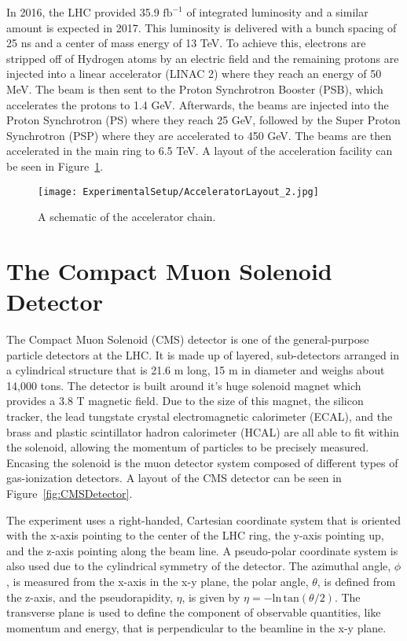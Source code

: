 In 2016, the LHC provided 35.9 $\mathrm{fb}^{-1}$ of integrated luminosity and a similar amount is expected in 2017. This luminosity is delivered with a bunch spacing of 25 ns and a center of mass energy of 13 TeV. To achieve this, electrons are stripped off of Hydrogen atoms by an electric field and the remaining protons are injected into a linear accelerator (LINAC 2) where they reach an energy of 50 MeV. The beam is then sent to the Proton Synchrotron Booster (PSB), which accelerates the protons to 1.4 GeV. Afterwards, the beams are injected into the Proton Synchrotron (PS) where they reach 25 GeV, followed by the Super Proton Synchrotron (PSP) where they are accelerated to 450 GeV. The beams are then accelerated in the main ring to 6.5 TeV. A layout of the acceleration facility can be seen in Figure~\ref{fig:AcceleratorLayout}\cite{LHCLayout}.

\begin{figure}[htbp]
\texttt{[image: ExperimentalSetup/AcceleratorLayout\_2.jpg]}
\caption{A schematic of the accelerator chain.}
\label{fig:AcceleratorLayout}
\end{figure}

\section{The Compact Muon Solenoid Detector}
The Compact Muon Solenoid (CMS) detector is one of the general-purpose particle detectors at the LHC. It is made up of layered, sub-detectors arranged in a cylindrical structure that is 21.6 m long, 15 m in diameter and weighs about 14,000 tons. The detector is built around it’s huge solenoid magnet which provides a 3.8 T magnetic field. Due to the size of this magnet, the silicon tracker, the lead tungstate crystal electromagnetic calorimeter (ECAL), and the brass and plastic scintillator hadron calorimeter (HCAL) are all able to fit within the solenoid, allowing the momentum of particles to be precisely measured. Encasing the solenoid is the muon detector system composed of different types of gas-ionization detectors. A layout of the CMS detector can be seen in Figure~\ref{fig:CMSDetector}.

The experiment uses a right-handed, Cartesian coordinate system that is oriented with the x-axis pointing to the center of the LHC ring, the y-axis pointing up, and the z-axis pointing along the beam line. A pseudo-polar coordinate system is also used due to the cylindrical symmetry of the detector. The azimuthal angle, $\phi$, is measured from the x-axis in the x-y plane, the polar angle, $\theta$, is defined from the z-axis, and the pseudorapidity, $\eta$, is given by $\eta = -\mathrm{ln}\, \mathrm{tan}(\theta/2)$. The transverse plane is used to define the component of observable quantities, like momentum and energy, that is perpendicular to the beamline in the x-y plane. 

